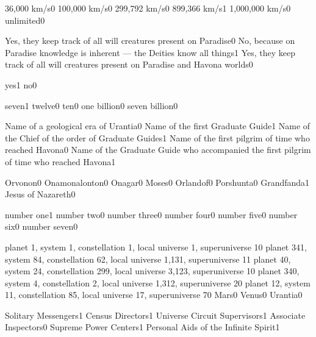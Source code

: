 
{36,000 km/s}{0}
{100,000 km/s}{0}
{299,792 km/s}{0}
{899,366 km/s}{1}
{1,000,000 km/s}{0}
{unlimited}{0}
\qstop


{Yes, they keep track of all will creatures present on Paradise}{0}
{No, because on Paradise knowledge is inherent --- the Deities know all things}{1}
{Yes, they keep track of all will creatures present on Paradise and Havona worlds}{0}
\qstop

{yes}{1}
{no}{0}
\qstop

{seven}{1}
{twelve}{0}
{ten}{0}
{one billion}{0}
{seven billion}{0}
\qstop

{Name of a geological era of Urantia}{0}
{Name of the first Graduate Guide}{1}
{Name of the Chief of the order of Graduate Guides}{1}
{Name of the first pilgrim of time who reached Havona}{0}
{Name of the Graduate Guide who accompanied the first pilgrim of time who reached Havona}{1}
\qstop

{Orvonon}{0}
{Onamonalonton}{0}
{Onagar}{0}
{Moses}{0}
{Orlandof}{0}
{Porshunta}{0}
{Grandfanda}{1}
{Jesus of Nazareth}{0}
\qstop

{number one}{1}
{number two}{0}
{number three}{0}
{number four}{0}
{number five}{0}
{number six}{0}
{number seven}{0}
\qstop

{planet 1, system 1, constellation 1, local universe 1, superuniverse 1}{0}
{planet 341, system 84, constellation 62, local universe 1,131, superuniverse 1}{1}
{planet 40, system 24, constellation 299, local universe 3,123, superuniverse 1}{0}
{planet 340, system 4, constellation 2, local universe 1,312, superuniverse 2}{0}
{planet 12, system 11, constellation 85, local universe 17, superuniverse 7}{0}
{Mars}{0}
{Venus}{0}
{Urantia}{0}
\qstop

{Solitary Messengers}{1}
{Census Directors}{1}
{Universe Circuit Supervisors}{1}
{Associate Inspectors}{0}
{Supreme Power Centers}{1}
{Personal Aids of the Infinite Spirit}{1}
\qstop

